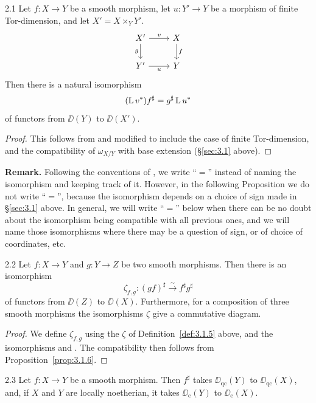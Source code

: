 \begin{bookproposition}{2.1}\label{prop:3.2.1}
Let $f\colon X\to Y$ be a smooth morphism, let $u\colon Y'\to Y$ be a morphism of finite Tor-dimension, and let $X'=X\times_Y Y'$.
\[
\begin{tikzcd}
	X' \arrow[r, "v"] \arrow[d, "g"'] & X \arrow[d, "f"] \\
	Y' \arrow[r, "u"'] & Y
\end{tikzcd}
\]
Then there is a natural isomorphism
\[
(\operatorname{L} v^*)f^{\sharp} = g^{\sharp}\operatorname{L} u^*
\]
of functors from $\DD(Y)$ to $\DD(X')$.
\end{bookproposition}

\begin{proof}
This follows from  and  modified to include the case of finite Tor-dimension, and the compatibility of $\omega_{X/Y}$ with base extension (\S\ref{sec:3.1} above).
\end{proof}

\textbf{Remark.}
Following the conventions of , we write ``$=$'' instead of naming the isomorphism and keeping track of it. However, in the following Proposition we do not write ``$=$'', because the isomorphism depends on a choice of sign made in \S\ref{sec:3.1} above. In general, we will write ``$=$'' below when there can be no doubt about the isomorphism being compatible with all previous ones, and we will name those isomorphisms where there may be a question of sign, or of choice of coordinates, etc.

\begin{bookproposition}{2.2}\label{prop:3.2.2}
Let $f\colon X\to Y$ and $g\colon Y\to Z$ be two smooth morphisms. Then there is an isomorphism
\[
\zeta_{f,g}\colon (gf)^{\sharp} \xrightarrow{\sim} f^{\sharp}g^{\sharp}
\]
of functors from $\DD(Z)$ to $\DD(X)$. Furthermore, for a composition of three smooth morphisms the isomorphisms $\zeta$ give a commutative diagram.
\end{bookproposition}

\begin{proof}
We define $\zeta_{f,g}$ using the $\zeta$ of Definition~\ref{def:3.1.5} above, and the isomorphisms  and . The compatibility then follows from Proposition~\ref{prop:3.1.6}.
\end{proof}

\begin{bookproposition}{2.3}\label{prop:3.2.3}
Let $f\colon X\to Y$ be a smooth morphism. Then $f^{\sharp}$ takes $\DD_{\mathrm{qc}}(Y)$ to $\DD_{\mathrm{qc}}(X)$, and, if $X$ and $Y$ are locally noetherian, it takes $\DD_{\mathrm{c}}(Y)$ to $\DD_{\mathrm{c}}(X)$.
\end{bookproposition}

